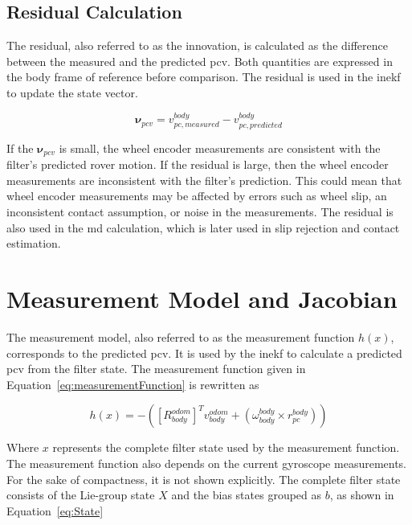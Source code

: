 \documentclass[report.tex]{subfiles}
\begin{document}
    \subsection{Residual Calculation} \label{subsec:residual}
    
    The residual, also referred to as the innovation, is calculated as the difference between the measured and the predicted \gls{pcv}. Both quantities are expressed in the body frame of reference before comparison. The residual is used in the \gls{inekf} to update the state vector.
    
    \begin{equation}
        \boldsymbol{\nu}_{pcv} =  {v}_{pc, measured}^{body} - {v}_{pc, predicted}^{body} 
    \label{eq:pcvResidual}
    \end{equation}
    
    If the $\boldsymbol{\nu}_{pcv}$ is small, the wheel encoder measurements are consistent with the filter's predicted rover motion. If the residual is large, then the wheel encoder measurements are inconsistent with the filter's prediction. This could mean that wheel encoder measurements may be affected by errors such as wheel slip, an inconsistent contact assumption, or noise in the measurements. The residual is also used in the \gls{md} calculation, which is later used in slip rejection and contact estimation.

    \section{Measurement Model and Jacobian}
    \label{sec:measurementModelAndJacobian}

    The measurement model, also referred to as the measurement function $h(x)$, corresponds to the predicted \gls{pcv}. It is used by the \gls{inekf} to calculate a predicted \gls{pcv} from the filter state. The measurement function given in Equation~\ref{eq:measurementFunction} is rewritten as

    \begin{equation}
        h(x)
        =
        -\left(
            [R_{body}^{odom}]^{T}v_{body}^{odom}
            +
            \left(
                \omega_{body}^{body}
                \times
                r_{pc}^{body}
            \right)
        \right)
        \label{eq:measurementFunction-2}
    \end{equation}

    Where $x$ represents the complete filter state used by the measurement function. The measurement function also depends on the current gyroscope measurements. For the sake of compactness, it is not shown explicitly. The complete filter state consists of the Lie-group state $X$ and the bias states grouped as $b$, as shown in Equation~\ref{eq:State}
\end{document}
